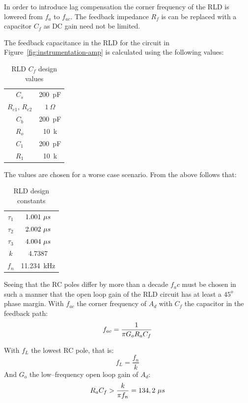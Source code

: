 In order to introduce lag compensation the corner frequency of the RLD
is lowered from $f_a$ to $f_{ac}$. The feedback impedance $R_f$ is can
be replaced with a capacitor $C_f$ as DC gain need not be limited.

The feedback capacitance in the RLD for the circuit in
Figure~\ref{fig:instrumentation-amp} is calculated using the following
values:
\begin{table}
\begin{center}	
	\begin{tabular}[htpb]{|c|c|} \hline
	$C_s$ & 200~pF \\
	$R_{e1}$, $R_{e2}$ & $1~\Omega$ \\
	$C_b$ & 200~pF \\
	$R_o$ & 10~k \\
	$C_1$ & 200~pF \\
	$R_1$ & 10~k \\
	\hline
	\end{tabular}
	\caption{RLD $C_f$ design values}
	\label{table:rld-cf}
\end{center}	
\end{table}

The values are chosen for a worse case scenario. From the above
follows that:

\begin{table}
\begin{center}	
	\begin{tabular}[htpb]{|c|c|} \hline
	$\tau_1$ & $1.001~\mu\/s$ \\
	$\tau_2$ & $2.002~\mu\/s$ \\
	$\tau_3$ & $4.004~\mu\/s$ \\
	$k$ & 4.7387 \\
	$f_n$ & 11.234~kHz \\
	\hline
	\end{tabular}
	\caption{RLD design constants}
	\label{table:rld-cfc}
\end{center}	
\end{table}

Seeing that the RC poles differ by more than a decade $f_ac$ must be
chosen in such a manner that the open loop gain of the RLD circuit has
at least a $45^o$ phase margin. With $f_{ac}$ the corner frequency of
$A_d$ with $C_f$ the capacitor in the feedback path:
\begin{equation}
	f_{ac} = \frac{1}{\pi\/G_oR_aC_f}
\end{equation}

With $f_L$ the lowest RC pole, that is:
\begin{equation}
	f_L = \frac{f_n}{k}
\end{equation}
And $G_o$ the low--frequency open loop gain of $A_d$:
\begin{equation}
	R_aC_f > \frac{k}{\pi\/f_n} = 134,2~\mu\/s
	\label{eq:rld-cf}
\end{equation}

